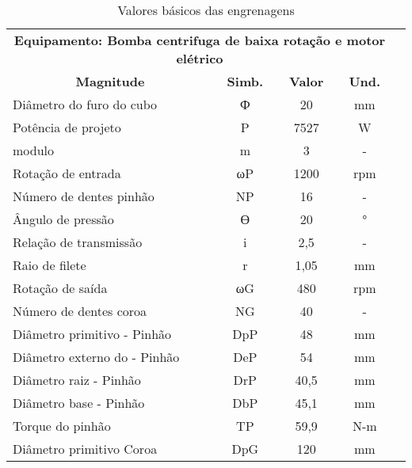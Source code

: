 \begin{table}[]
\centering
\caption{\label{tab:3} Valores básicos das engrenagens}
\begin{tabular}{l c c c c}
\hline
\multicolumn{4}{c}{\textbf{Equipamento: Bomba centrifuga de baixa rotação e motor elétrico}} \\
\multicolumn{1}{c}{\textbf{Magnitude}}  & \textbf{Simb.}  & \textbf{Valor}  & \textbf{Und.}  \\
Diâmetro do furo do cubo                & Ф               & 20              & mm             \\
Potência de projeto                     & P               & 7527            & W              \\
modulo                                  & m               & 3               & -              \\
Rotação de entrada                      & ωP              & 1200            & rpm            \\
Número de dentes pinhão                 & NP              & 16              & -              \\
Ângulo de pressão                       & ϴ               & 20              & °              \\
Relação de transmissão                  & i               & 2,5             & -              \\
Raio de filete                          & r               & 1,05            & mm             \\
Rotação de saída                        & ωG              & 480             & rpm            \\
Número de dentes coroa                  & NG              & 40              & -              \\
Diâmetro primitivo - Pinhão             & DpP             & 48              & mm             \\
Diâmetro externo do - Pinhão            & DeP             & 54              & mm             \\
Diâmetro raiz - Pinhão                  & DrP             & 40,5            & mm             \\
Diâmetro base - Pinhão                  & DbP             & 45,1            & mm             \\
Torque do pinhão                        & TP              & 59,9            & N-m            \\
Diâmetro primitivo Coroa                & DpG             & 120             & mm             \\

\end{tabular}
\end{table}
